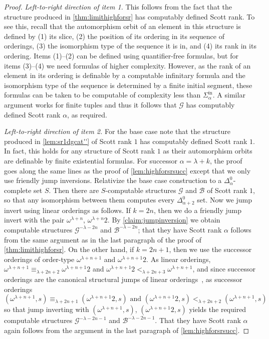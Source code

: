 \documentclass{amsart}
\newcommand\+[1]{\mathcal{#1}}
\renewcommand\*[1]{\mathbf{#1}}
\renewcommand\=[1]{\text{#1}}
\renewcommand\*[1]{\mathbf{#1}}
\newcommand{\Sinf}[1]{\Sigma^{\mathrm{in}}_{#1}}
\begin{document}
\begin{proof}
  \emph{Left-to-right direction of item 1.} This follows from the fact that the structure produced in \cref{thm:limithighforsr} has computably defined Scott rank. To see this, recall that the automorphism orbit of an element in this structure is defined by (1) its slice, (2) the position of its ordering in its sequence of orderings, (3) the isomorphism type of the sequence it is in, and (4) its rank in its ordering. Items (1)--(2) can be defined using quantifier-free formulas, but for items (3)--(4) we need formulas of higher complexity. However, as the rank of an element in its ordering is definable by a computable infinitary formula and the isomorphism type of the sequence is determined by a finite initial segment, these formulas can be taken to be computable of complexity less than $\Sinf\alpha$. A similar argument works for finite tuples and thus it follows that $\+G$ has computably defined Scott rank $\alpha$, as required.
  
  \emph{Left-to-right direction of item 2.} For the base case note that the structure produced in \cref{lem:sr1dgcat''} of Scott rank $1$ has computably defined Scott rank $1$. In fact, this holds for any structure of Scott rank $1$ as their automorphism orbits are definable by finite existential formulas. For successor $\alpha=\lambda+k$, the proof goes along the same lines as the proof of \cref{lem:highforsrsucc} except that we only use friendly jump inversions. Relativize the base case construction to a $\Delta^0_{\alpha}$-complete set $S$. Then there are $S$-computable structures $\+G$ and $\+B$ of Scott rank $1$, so that any isomorphism between them computes every $\Delta^0_{\alpha+2}$ set. Now we jump invert using linear orderings as follows. If $k=2n$, then we do a friendly jump invert with the pair $\omega^{\lambda+n}$, $\omega^{\lambda+n}2$. By \cref{claim:jumpinversion} we obtain computable structures $\+G^{-\lambda-2n}$ and $\+B^{-\lambda-2n}$; that they have Scott rank $\alpha$ follows from the same argument as in the last paragraph of the proof of \cref{thm:limithighforsr}. On the other hand, if $k=2n+1$, then we use the successor orderings of order-type $\omega^{\lambda+n+1}$ and $\omega^{\lambda+n+1}2$. As linear orderings, $\omega^{\lambda+n+1}\equiv_{\lambda+2n+2} \omega^{\lambda+n+1}2$ and $\omega^{\lambda+n+1}2<_{\lambda+2n+3} \omega^{\lambda+n+1}$, and since successor orderings are the canonical structural jumps of linear orderings~\cite[Chapter 10]{montalban2021}, as successor orderings
\[ (\omega^{\lambda+n+1},s)\equiv_{\lambda+2n+1} (\omega^{\lambda+n+1}2,s) \text{ and }(\omega^{\lambda+n+1}2,s)<_{\lambda+2n+2} (\omega^{\lambda+n+1},s)\]
  so that jump inverting with $(\omega^{\lambda+n+1},s)$, $(\omega^{\lambda+n+1}2,s)$ yields the required computable structures $\+G^{-\lambda-2n-1}$ and $\+B^{-\lambda-2n-1}$. That they have Scott rank $\alpha$ again follows from the argument in the last paragraph of \cref{lem:highforsrsucc}.  
\end{proof}
\end{document}
